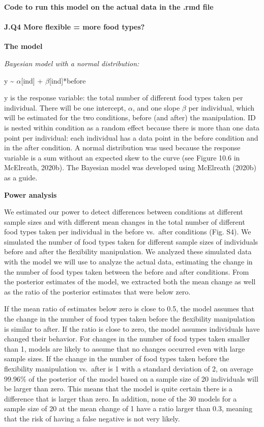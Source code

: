 \documentclass[
]{article}
\begin{document}
\textbf{Code to run this model on the actual data in the .rmd file}

\paragraph{J.Q4 More flexible = more food
types?}\label{j.q4-more-flexible-more-food-types}

\textbf{The model}

\emph{Bayesian model with a normal distribution:}

y \textasciitilde{} \(\alpha\){[}ind{]} + \(\beta\){[}ind{]}*before

y is the response variable: the total number of different food types
taken per individual. There will be one intercept, \(\alpha\), and one
slope \(\beta\) per individual, which will be estimated for the two
conditions, before (and after) the manipulation. ID is nested within
condition as a random effect because there is more than one data point
per individual: each individual has a data point in the before condition
and in the after condition. A normal distribution was used because the
response variable is a sum without an expected skew to the curve (see
Figure 10.6 in McElreath, 2020b). The Bayesian model was developed using
McElreath (2020b) as a guide.

\textbf{Power analysis}

We estimated our power to detect differences between conditions at
different sample sizes and with different mean changes in the total
number of different food types taken per individual in the before
vs.~after conditions (Fig. S4). We simulated the number of food types
taken for different sample sizes of individuals before and after the
flexibility manipulation. We analyzed these simulated data with the
model we will use to analyze the actual data, estimating the change in
the number of food types taken between the before and after conditions.
From the posterior estimates of the model, we extracted both the mean
change as well as the ratio of the posterior estimates that were below
zero.

If the mean ratio of estimates below zero is close to 0.5, the model
assumes that the change in the number of food types taken before the
flexibility manipulation is similar to after. If the ratio is close to
zero, the model assumes individuals have changed their behavior. For
changes in the number of food types taken smaller than 1, models are
likely to assume that no changes occurred even with large sample sizes.
If the change in the number of food types taken before the flexibility
manipulation vs.~after is 1 with a standard deviation of 2, on average
99.96\% of the posterior of the model based on a sample size of 20
individuals will be larger than zero. This means that the model is quite
certain there is a difference that is larger than zero. In addition,
none of the 30 models for a sample size of 20 at the mean change of 1
have a ratio larger than 0.3, meaning that the risk of having a false
negative is not very likely.
\end{document}
